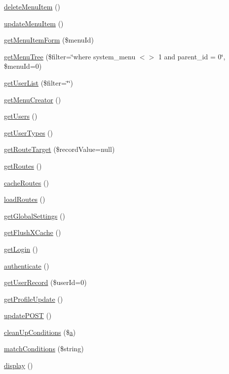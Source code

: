 \begin{DoxyCompactItemize}
\item 
\hyperlink{classKim_ab0a2f80e33b3d6ed654fbf6b8cf55291}{delete\+Menu\+Item} ()
\item 
\hyperlink{classKim_a1c8f6358dbec4612dd880ae09cb4a74e}{update\+Menu\+Item} ()
\item 
\hyperlink{classKim_a2a73684a878eac950d34f15ce674f194}{get\+Menu\+Item\+Form} (\$menu\+Id)
\item 
\hyperlink{classKim_a7f493912f2db5510a30faebd9b553162}{get\+Menu\+Tree} (\$filter=\char`\"{}where system\+\_\+menu $<$$>$ 1 and parent\+\_\+id = 0\char`\"{}, \$menu\+Id=0)
\item 
\hyperlink{classKim_afce7f678a883aab27b976429e8248d79}{get\+User\+List} (\$filter=\char`\"{}\char`\"{})
\item 
\hyperlink{classKim_a0fb70ab1aedbf3be92bfdd9241944e6b}{get\+Menu\+Creator} ()
\item 
\hyperlink{classKim_a31a5796278c813534e76d2ce91d9eed2}{get\+Users} ()
\item 
\hyperlink{classKim_a03d8b762e1c6d458e714904cd8b02dd6}{get\+User\+Types} ()
\item 
\hyperlink{classKim_a8ed17935db3df4dfc01b2b26d47ebc4e}{get\+Route\+Target} (\$record\+Value=null)
\item 
\hyperlink{classKim_a1e3ce6c13bf4c0b488ff07ddfe95c0ac}{get\+Routes} ()
\item 
\hyperlink{classKim_a5fcd3a64ecd0f244e9db70f0c007b6ba}{cache\+Routes} ()
\item 
\hyperlink{classKim_a99011f068ed5a1f55fd8c5cf2b1aac43}{load\+Routes} ()
\item 
\hyperlink{classKim_a2bcf75443f82b5c8f49b4e82bdcab94d}{get\+Global\+Settings} ()
\item 
\hyperlink{classKim_a54e4f46e005a09de5bda3a2093a86af7}{get\+Flush\+X\+Cache} ()
\item 
\hyperlink{classKim_a7531e4d2f4da4cb34176d40d20ee6401}{get\+Login} ()
\item 
\hyperlink{classKim_abfaef7d8d59b67ed50d46053b0154b1d}{authenticate} ()
\item 
\hyperlink{classKim_a6c3ce83f2f3bc3c7743f1bfa46f30d0e}{get\+User\+Record} (\$user\+Id=0)
\item 
\hyperlink{classKim_acbae7ab945d82706b2be25816578ae71}{get\+Profile\+Update} ()
\item 
\hyperlink{classKim_a3725ce24c9501992a03e6386423e447c}{update\+P\+O\+S\+T} ()
\item 
\hyperlink{classKim_a1187d9c11984f0daf1f6fa983378d4e7}{clean\+Up\+Conditions} (\$\hyperlink{Shape_8php_a868083704107d6d05b69983f62cce171}{a})
\item 
\hyperlink{classKim_a06415955f55535b121470e7779e92168}{match\+Conditions} (\$string)
\item 
\hyperlink{classKim_ae017a30aaa5b1f6e470de679142b7f02}{display} ()
\end{DoxyCompactItemize}
